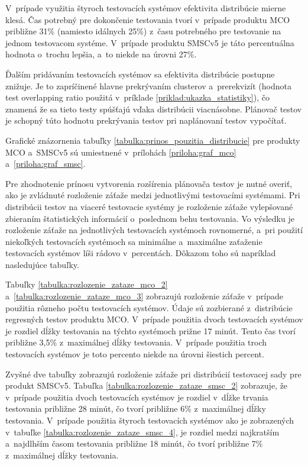 V~prípade využitia štyroch testovacích systémov efektivita distribúcie 
mierne klesá. Čas potrebný pre dokončenie testovania tvorí 
v~prípade produktu MCO približne 31\% (namiesto idálnych 25\%) 
z~času potrebného pre testovanie na jednom testovacom systéme.
V~prípade produktu SMSCv5 je táto percentuálna hodnota o~trochu 
lepšia, a~to niekde na úrovni 27\%.

Ďalším pridávaním testovacích systémov sa efektivita distribúcie 
postupne znižuje. Je to zapríčinené hlavne prekrývaním clusterov 
a~prerekvizít (hodnota test overlapping ratio použitá v~príklade 
\ref{priklad:ukazka_statistiky}), čo znamená že sa tieto testy spúšťajú 
vďaka distribúcii viacnásobne. Plánovač testov je schopný túto 
hodnotu prekrývania testov pri naplánovaní testov vypočítať.

Grafické znázornenia tabuľky \ref{tabulka:prinos_pouzitia_distribucie}
pre produkty MCO a~SMSCv5 sú umiestnené v~prílohách 
\ref{priloha:graf_mco} a~\ref{priloha:graf_smsc}.

Pre zhodnotenie prínosu vytvorenia rozšírenia plánovača testov je nutné
overiť, ako je zvládnuté rozloženie záťaže medzi jednotlivými testovacími
systémami. Pri distribúcii testov na viaceré testovacie systémy je 
rozloženie záťaže vylepšované zbieraním štatistických informácií o~poslednom
behu testovania. 
Vo výsledku je rozloženie záťaže na jednotlivých testovacích systémoch
rovnomerné, a~pri použití niekoľkých testovacích systémoch sa 
minimálne a~maximálne zaťaženie testovacích systémov líši rádovo v~percentách.
Dôkazom toho sú napríklad nasledujúce tabuľky. 

Tabuľky \ref{tabulka:rozlozenie_zataze_mco_2} a~\ref{tabulka:rozlozenie_zataze_mco_3} 
zobrazujú rozloženie záťaže v~prípade
použitia rôzneho počtu testovacích systémov. Údaje sú zozbierané
z~distribúcie regresných testov produktu MCO. V~prípade použitia
dvoch testovacích systémov je rozdiel dĺžky testovania na týchto systémoch
prižne 17 minút. Tento čas tvorí približne 3,5\% z~maximálnej dĺžky testovania.
V~prípade použitia troch testovacích systémov je toto percento niekde 
na úrovni šiestich percent.
 
Zvyšné dve tabuľky zobrazujú rozloženie záťaže pri distribúcií testovacej
sady pre produkt SMSCv5. Tabuľka \ref{tabulka:rozlozenie_zataze_smsc_2} 
zobrazuje, že v~prípade použitia dvoch testovacích systémov je rozdiel
v~dĺžke trvania testovania približne 28 minút, čo tvorí približne 6\%
z~maximálnej dĺžky testovania. V~prípade použitia štyroch
testovacích systémov ako je zobrazených v~tabuľke \ref{tabulka:rozlozenie_zataze_smsc_4},
je rozdiel medzi najkratším a~najdlhším časom testovania približne 18 minút, čo
tvorí približne 7\% z~maximálnej dĺžky testovania.



